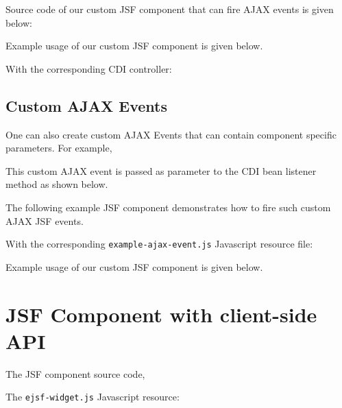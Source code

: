 Source code of our custom JSF component that can fire AJAX events is given below:


Example usage of our custom JSF component is given below.


With the corresponding CDI controller:


\subsection{Custom AJAX Events}

One can also create custom AJAX Events that can contain component specific parameters.
For example,


This custom AJAX event is passed as parameter to the CDI bean listener method as shown below.


The following example JSF component demonstrates how to fire such custom AJAX JSF events.


With the corresponding \texttt{example-ajax-event.js} Javascript resource file:


Example usage of our custom JSF component is given below.


\section{JSF Component with client-side API}
The JSF component source code,


The \texttt{ejsf-widget.js} Javascript resource:


